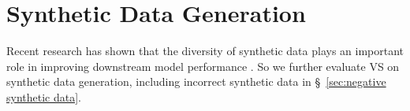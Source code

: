 \section{Synthetic Data Generation}
\label{sec:sythetic data}
Recent research has shown that the diversity of synthetic data plays an important role in improving downstream model performance \citep{chen_diversity_2024,zhu2025bareleveragingbaselanguage}. So we further evaluate VS on synthetic data generation, including incorrect synthetic data  in \S~\ref{sec:negative synthetic data}.


